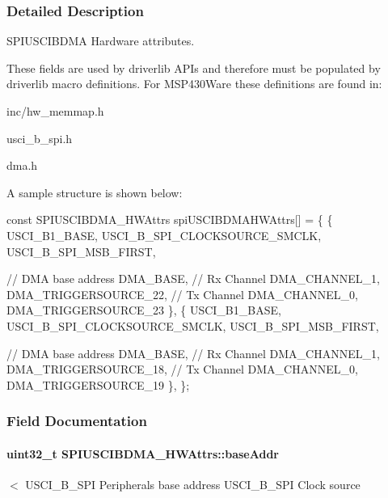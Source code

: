 \subsubsection{Detailed Description}
S\+P\+I\+U\+S\+C\+I\+B\+D\+M\+A Hardware attributes. 

These fields are used by driverlib A\+P\+Is and therefore must be populated by driverlib macro definitions. For M\+S\+P430\+Ware these definitions are found in\+:
\begin{DoxyItemize}
\item inc/hw\+\_\+memmap.\+h
\item usci\+\_\+b\+\_\+spi.\+h
\item dma.\+h
\end{DoxyItemize}

A sample structure is shown below\+: 
\begin{DoxyCode}
\textcolor{keyword}{const} SPIUSCIBDMA_HWAttrs spiUSCIBDMAHWAttrs[] = \{
    \{
        USCI\_B1\_BASE,
        USCI\_B\_SPI\_CLOCKSOURCE\_SMCLK,
        USCI\_B\_SPI\_MSB\_FIRST,

        \textcolor{comment}{// DMA base address}
        DMA\_BASE,
        \textcolor{comment}{// Rx Channel}
        DMA\_CHANNEL\_1,
        DMA\_TRIGGERSOURCE\_22,
        \textcolor{comment}{// Tx Channel}
        DMA\_CHANNEL\_0,
        DMA\_TRIGGERSOURCE\_23
    \},
    \{
        USCI\_B1\_BASE,
        USCI\_B\_SPI\_CLOCKSOURCE\_SMCLK,
        USCI\_B\_SPI\_MSB\_FIRST,

        \textcolor{comment}{// DMA base address}
        DMA\_BASE,
        \textcolor{comment}{// Rx Channel}
        DMA\_CHANNEL\_1,
        DMA\_TRIGGERSOURCE\_18,
        \textcolor{comment}{// Tx Channel}
        DMA\_CHANNEL\_0,
        DMA\_TRIGGERSOURCE\_19
    \},
\};
\end{DoxyCode}
 

\subsubsection{Field Documentation}
\paragraph[{base\+Addr}]{\setlength{\rightskip}{0pt plus 5cm}uint32\+\_\+t S\+P\+I\+U\+S\+C\+I\+B\+D\+M\+A\+\_\+\+H\+W\+Attrs\+::base\+Addr}\label{struct_s_p_i_u_s_c_i_b_d_m_a___h_w_attrs_aaae9facc7079e3bfd9b7a3b74d6f8652}
$<$ U\+S\+C\+I\+\_\+\+B\+\_\+\+S\+P\+I Peripheral\textquotesingle{}s base address U\+S\+C\+I\+\_\+\+B\+\_\+\+S\+P\+I Clock source 
